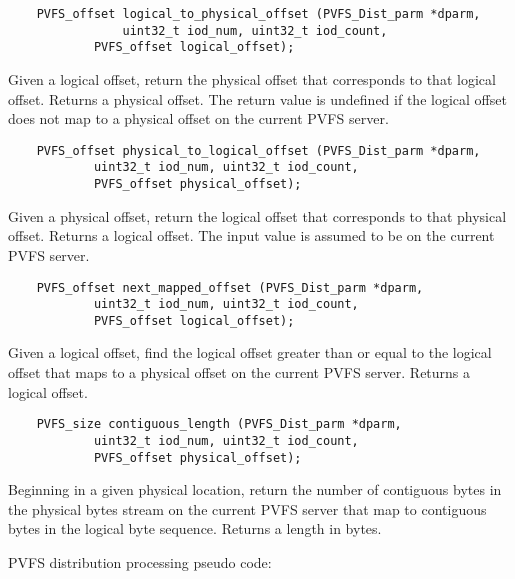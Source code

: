 \documentclass[11pt]{article}
\begin{document}
\begin{verbatim}
   	PVFS_offset logical_to_physical_offset (PVFS_Dist_parm *dparm,
        		uint32_t iod_num, uint32_t iod_count,
         	PVFS_offset logical_offset);
\end{verbatim}

Given a logical offset, return the physical offset that corresponds to
that logical offset.  Returns a physical offset.  The return value is
undefined if the logical offset does not map to a physical offset on
the current PVFS server.

\begin{verbatim}
   	PVFS_offset physical_to_logical_offset (PVFS_Dist_parm *dparm,
         	uint32_t iod_num, uint32_t iod_count,
         	PVFS_offset physical_offset);
\end{verbatim}

Given a physical offset, return the logical offset that corresponds to
that physical offset.  Returns a logical offset.  The input value is
assumed to be on the current PVFS server.

\begin{verbatim}
   	PVFS_offset next_mapped_offset (PVFS_Dist_parm *dparm,
         	uint32_t iod_num, uint32_t iod_count,
         	PVFS_offset logical_offset);
\end{verbatim}

Given a logical offset, find the logical offset greater than or equal
to the logical offset that maps to a physical offset on the current
PVFS server.  Returns a logical offset.

\begin{verbatim}
   	PVFS_size contiguous_length (PVFS_Dist_parm *dparm,
         	uint32_t iod_num, uint32_t iod_count,
         	PVFS_offset physical_offset);
\end{verbatim}

Beginning in a given physical location, return the number of contiguous
bytes in the physical bytes stream on the current PVFS server that map
to contiguous bytes in the logical byte sequence.  Returns a length in bytes.

PVFS distribution processing pseudo code:
\end{document}
